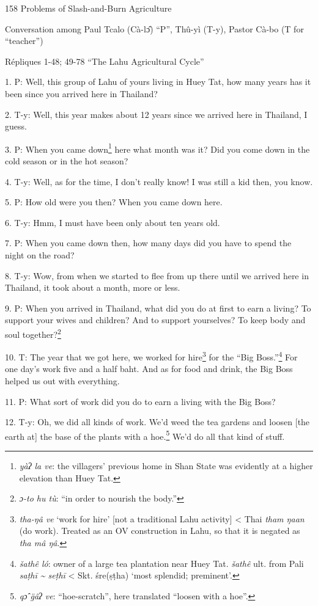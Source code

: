 
158 Problems of Slash-and-Burn Agriculture

Conversation among Paul Tcalo (Cà-lɔ̂) ``P'', Thû-yì (T-y), Pastor Cà-bo
(T for ``teacher'')

Répliques 1-48; 49-78 ``The Lahu Agricultural Cycle''

1. P: Well, this group of Lahu of yours living in Huey Tat, how many years has
it been since you arrived here in Thailand?

2. T-y: Well, this year makes about 12 years since we arrived here in Thailand,
I guess.

3. P: When you came down\footnote{\textit{yàʔ la ve}: the villagers' previous home in Shan State was evidently at a higher elevation than Huey Tat.} here what month was it? Did you come down in the cold
season or in the hot season?

4. T-y: Well, as for the time, I don't really know! I was still a kid then, you
know.

5. P: How old were you then? When you came down here.

6. T-y: Hmm, I must have been only about ten years old.

7. P: When you came down then, how many days did you have to spend the night on
the road?

8. T-y: Wow, from when we started to flee from up there until we arrived here in
Thailand, it took about a month, more or less.

9. P: When you arrived in Thailand, what did you do at first to earn a living?
To support your wives and children? And to support yourselves? To keep body and
soul together?\footnote{\textit{ɔ-to hu tù}: ``in order to nourish the body.''}

10. T: The year that we got here, we worked for hire\footnote{\textit{tha-ŋâ ve} `work for hire' [not a traditional Lahu activity] < Thai \textit{tham ŋaan} (do work). Treated as an OV construction in Lahu, so that it is negated as \textit{tha mâ ŋâ}.} for the ``Big Boss.''\footnote{\textit{šathê ló}: owner of a large tea plantation near Huey Tat. \textit{šathê }ult. from Pali \textit{saṭhī \textasciitilde{} seṭhī} < Skt. śre(ṣṭha) `most splendid; preminent'.}
For one day's work five and a half baht. And as for food and drink, the Big Boss
helped us out with everything.

11. P: What sort of work did you do to earn a living with the Big Boss?

12. T-y: Oh, we did all kinds of work. We'd weed the tea gardens and loosen [the
earth at] the base of the plants with a hoe.\footnote{\textit{qɔ̂ g̈âʔ ve}: ``hoe-scratch'', here translated ``loosen with a hoe''.} We'd do all that kind of stuff.

